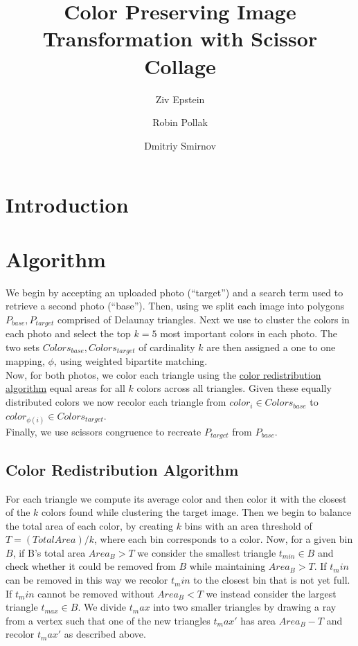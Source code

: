 \documentclass[a4paper,UKenglish]{lipics-v2016}
\title{Color Preserving Image Transformation with Scissor Collage}
\author[1]{Ziv Epstein}
\author[1]{Robin Pollak}
\author[1]{Dmitriy Smirnov}
\affil[1]{Computer Science Department, Pomona College\\
  Claremont,CA\\
  \{\texttt{ziv.epstein, robin.pollak, dmitriy.smirnov}\}\texttt{@pomona.edu}}
\begin{document}
\maketitle

\begin{abstract}

 \end{abstract}

\section{Introduction}

\section{Algorithm}
We begin by accepting an uploaded photo (``target'') and a search term used to retrieve a second photo (``base''). Then, using \cite[Georg Fischer's triangulation algorithm]{https://snorpey.github.io/triangulation/} we split each image into polygons $P_{base}, P_{target}$ comprised of Delaunay triangles. Next we use \cite[k-means]{k-means} to cluster the colors in each photo and select the top $k=5$ most important colors in each photo. The two sets $Colors_{base}, Colors_{target}$ of cardinality $k$  are then assigned a one to one mapping, $\phi$, using weighted bipartite matching. \\
Now, for both photos, we color each triangle using the \hyperref[sec:algorithm1]{color redistribution algorithm} equal areas for all $k$ colors across all triangles. Given these equally distributed colors we now recolor each triangle from $color_i\in Colors_{base}$ to $color_{\phi(i)}\in Colors_{target}$. \\
Finally, we use scissors congruence to recreate $P_{target}$ from $P_{base}$. 

\subsection{Color Redistribution Algorithm}
\label{sec:algorithm1}
For each triangle we compute its average color and then color it with the closest of the $k$ colors found while clustering the target image. Then we begin to balance the total area of each color, by creating $k$ bins with an area threshold of $T=(Total Area)/k$, where each bin corresponds to a color. Now, for a given bin $B$, if B's total area $Area_B>T$ we consider the smallest triangle $t_{min} \in B$ and check whether it could be removed from $B$ while maintaining $Area_B>T$. If $t_min$ can be removed in this way we recolor $t_min$ to the closest bin that is not yet full. If $t_min$ cannot be removed without $Area_B<T$ we instead consider the largest triangle $t_{max}\in B$. We divide $t_max$ into two smaller triangles by drawing a ray from a vertex such that one of the new triangles $t_max'$ has area $Area_B-T$ and recolor $t_max'$ as described above.
\end{document}
